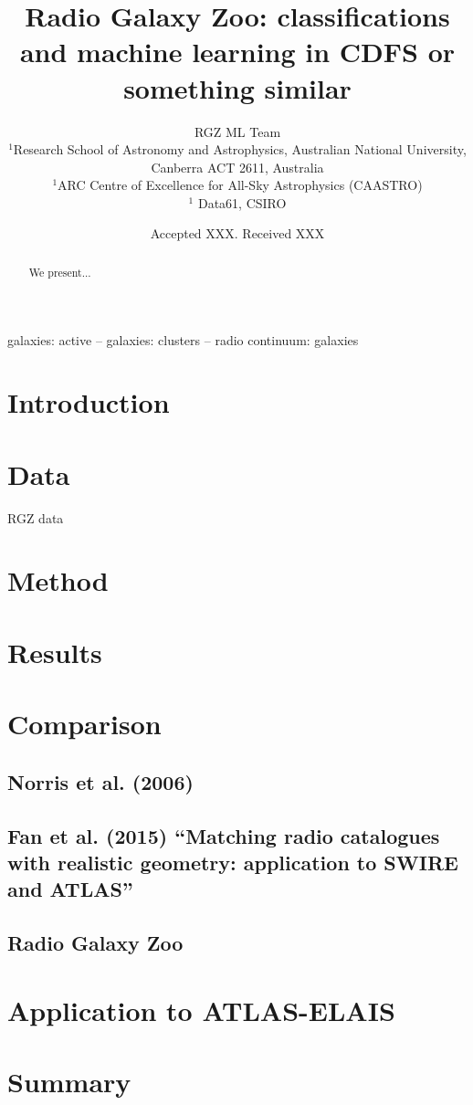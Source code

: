 \documentclass[fleqn,usenatbib,usedcolumn]{mnras}
\title[ML CDFS]{Radio Galaxy Zoo: classifications and machine learning in CDFS or something similar}
\author[RGZ ML Team]{RGZ ML Team
\\
$^{1}$Research School of Astronomy and Astrophysics, Australian National University, Canberra ACT 2611, Australia\\
$^{1}$ARC Centre of Excellence for All-Sky Astrophysics (CAASTRO)\\
$^{1}$ Data61, CSIRO\\
}
\date{Accepted XXX. Received XXX}
\begin{document}
\label{firstpage}
\pagerange{\pageref{firstpage}--\pageref{lastpage}}
\maketitle

\begin{abstract}
We present...
\end{abstract}

\begin{keywords}
galaxies: active -- galaxies: clusters -- radio continuum: galaxies
\end{keywords}

\section{Introduction}\label{sec:intro}

\section{Data}\label{sec:data}
RGZ data
\section{Method}

\section{Results}

\section{Comparison}
\subsection{Norris et al. (2006)}
\subsection{Fan et al. (2015) ``Matching radio catalogues with realistic geometry: application to SWIRE and ATLAS''}
\subsection{Radio Galaxy Zoo}

\section{Application to ATLAS-ELAIS}

\section{Summary}
% 





\bsp	%
\label{lastpage}
\end{document}
